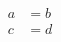 \documentclass{article}
\begin{document}
\begin{align}
  a &= b \\
  c &= d
\end{align}
\end{document}
